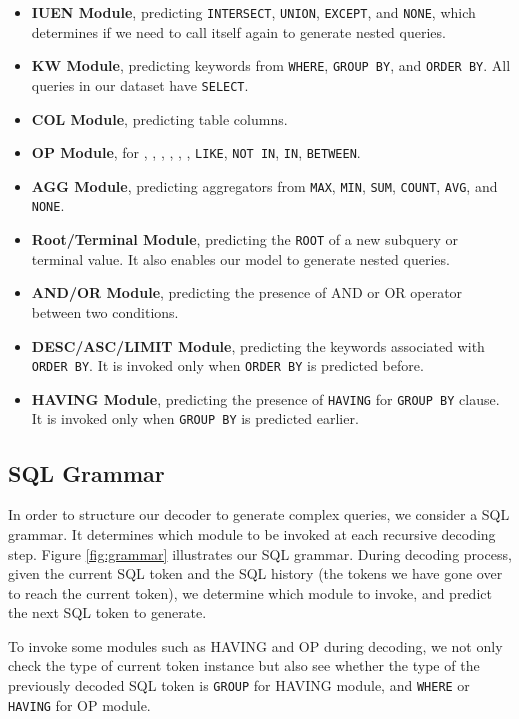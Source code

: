 \documentclass[11pt,a4paper]{article}
\begin{document}
\begin{itemize}
\setlength{\itemsep}{0mm}
\setlength{\leftskip}{-1mm}
    \item \textbf{IUEN Module}, predicting \texttt{INTERSECT}, \texttt{UNION}, \texttt{EXCEPT}, and \texttt{NONE}, which determines if we need to call itself again to generate nested queries.
    \item \textbf{KW Module}, predicting keywords from \texttt{WHERE}, \texttt{GROUP BY}, and \texttt{ORDER BY}. All queries in our dataset have \texttt{SELECT}.
    \item \textbf{COL Module}, predicting table columns.
    \item \textbf{OP Module}, for , , , , , , \texttt{LIKE}, \texttt{NOT IN}, \texttt{IN}, \texttt{BETWEEN}.
    \item \textbf{AGG Module}, predicting aggregators from \texttt{MAX}, \texttt{MIN}, \texttt{SUM}, \texttt{COUNT}, \texttt{AVG}, and \texttt{NONE}.
    \item \textbf{Root/Terminal Module}, predicting the \texttt{ROOT} of a new subquery or terminal value. It also enables our model to generate nested queries.
    \item \textbf{AND/OR Module}, predicting the presence of AND or OR operator between two conditions.
    \item \textbf{DESC/ASC/LIMIT Module},  predicting the keywords associated with \texttt{ORDER BY}. It is invoked only when \texttt{ORDER BY} is predicted before.
    \item \textbf{HAVING Module}, predicting the presence of \texttt{HAVING} for \texttt{GROUP BY} clause. It is invoked only when \texttt{GROUP BY} is predicted earlier. \vspace{-2mm}
\end{itemize} 


\subsection{SQL Grammar}

In order to structure our decoder to generate complex queries, we consider a SQL grammar.
It determines which module to be invoked at each recursive decoding step.
Figure \ref{fig:grammar} illustrates our SQL grammar.
During decoding process, given the current SQL token and the SQL history (the tokens we have gone over to reach the current token), we determine which module to invoke, and predict the next SQL token to generate.

To invoke some modules such as HAVING and OP during decoding, we not only check the type of current token instance but also see whether the type of the previously decoded SQL token is \texttt{GROUP} for HAVING module, and \texttt{WHERE} or \texttt{HAVING} for OP module.
\end{document}
